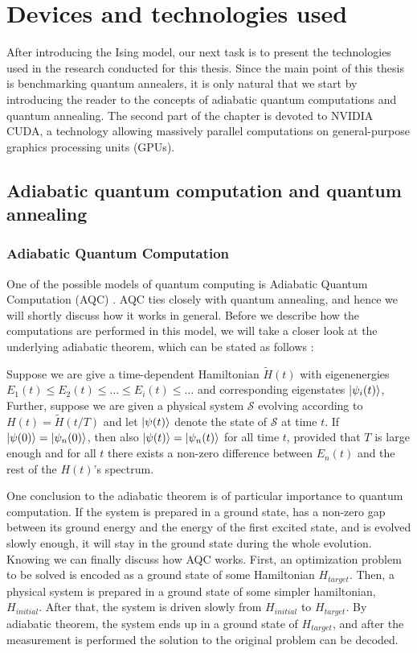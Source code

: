 \chapter{Devices and technologies used}
\label{chapter:near-term}

After introducing the Ising model, our next task is to present the technologies used in the
research conducted for this thesis. Since the main point of this thesis is benchmarking quantum
annealers, it is only natural that we start by introducing the reader to the concepts of adiabatic
quantum computations and quantum annealing. The second part of the chapter is devoted to NVIDIA CUDA, a technology allowing massively parallel computations on general-purpose graphics processing
units (GPUs).


\section{Adiabatic quantum computation and quantum annealing}

\subsection{Adiabatic Quantum Computation}
One of the possible models of quantum computing is Adiabatic Quantum Computation (AQC)
\cite{farhi}. AQC ties closely with quantum annealing, and hence we will shortly discuss how it
works in general. Before we describe how the computations are performed in this model, we will take
a closer look at the underlying adiabatic theorem, which can be stated as follows \cite{farhi,
born}:

\begin{theorem}
Suppose we are give a time-dependent Hamiltonian $\tilde{H}(t)$ with eigenenergies $E_1(t) \le E_2(t) \le
 \ldots \le E_i(t) \le \ldots$ and corresponding eigenstates $\ket{\psi_i(t)}$, Further, suppose we
 are given a physical system $\mathcal{S}$ evolving according to $H(t) = \tilde{H}(t/T)$ and let
 $\ket{\psi(t)}$ denote the state of $\mathcal{S}$ at time $t$. If $\ket{\psi(0)} =
 \ket{\psi_n(0)}$, then also $\ket{\psi(t)} = \ket{\psi_n(t)}$ for all time $t$, provided that $T$ is large
 enough and for all $t$ there
 exists a non-zero difference between $E_n(t)$ and the rest of the $H(t)$'s spectrum.
\end{theorem}

One conclusion to the adiabatic theorem is of particular importance to quantum computation. If the
system is prepared in a ground state, has a non-zero gap between its ground energy and the energy of
the first excited state, and is evolved slowly enough, it will stay in the ground state during the
whole evolution. Knowing we can finally discuss how AQC works. First, an optimization problem
to be solved is encoded as a ground state of some Hamiltonian $H_{target}$. Then, a physical system
is prepared in a ground state of some simpler hamiltonian, $H_{initial}$. After that, the system is
driven slowly from $H_{initial}$ to $H_{target}$. By adiabatic theorem, the system ends up in a
ground state of $H_{target}$, and after the measurement is performed the solution to the original
problem can be decoded.

